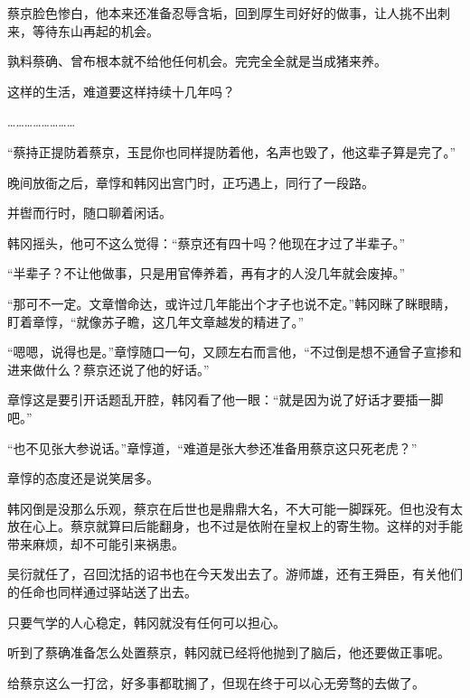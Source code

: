 蔡京脸色惨白，他本来还准备忍辱含垢，回到厚生司好好的做事，让人挑不出刺来，等待东山再起的机会。

孰料蔡确、曾布根本就不给他任何机会。完完全全就是当成猪来养。

这样的生活，难道要这样持续十几年吗？

……………………

“蔡持正提防着蔡京，玉昆你也同样提防着他，名声也毁了，他这辈子算是完了。”

晚间放衙之后，章惇和韩冈出宫门时，正巧遇上，同行了一段路。

并辔而行时，随口聊着闲话。

韩冈摇头，他可不这么觉得：“蔡京还有四十吗？他现在才过了半辈子。”

“半辈子？不让他做事，只是用官俸养着，再有才的人没几年就会废掉。”

“那可不一定。文章憎命达，或许过几年能出个才子也说不定。”韩冈眯了眯眼睛，盯着章惇，“就像苏子瞻，这几年文章越发的精进了。”

“嗯嗯，说得也是。”章惇随口一句，又顾左右而言他，“不过倒是想不通曾子宣掺和进来做什么？蔡京还说了他的好话。”

章惇这是要引开话题乱开腔，韩冈看了他一眼：“就是因为说了好话才要插一脚吧。”

“也不见张大参说话。”章惇道，“难道是张大参还准备用蔡京这只死老虎？”

章惇的态度还是说笑居多。

韩冈倒是没那么乐观，蔡京在后世也是鼎鼎大名，不大可能一脚踩死。但也没有太放在心上。蔡京就算曰后能翻身，也不过是依附在皇权上的寄生物。这样的对手能带来麻烦，却不可能引来祸患。

吴衍就任了，召回沈括的诏书也在今天发出去了。游师雄，还有王舜臣，有关他们的任命也同样通过驿站送了出去。

只要气学的人心稳定，韩冈就没有任何可以担心。

听到了蔡确准备怎么处置蔡京，韩冈就已经将他抛到了脑后，他还要做正事呢。

给蔡京这么一打岔，好多事都耽搁了，但现在终于可以心无旁骛的去做了。


